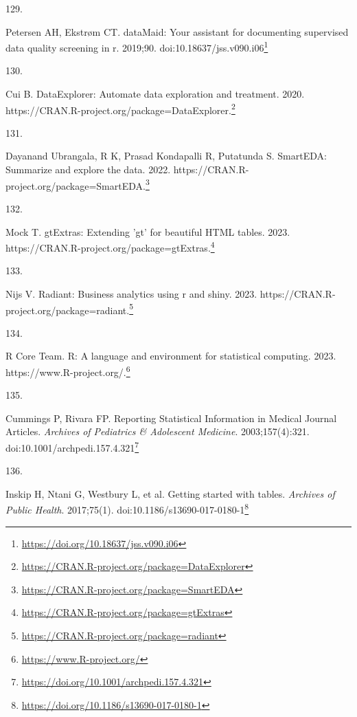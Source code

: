 \documentclass[
  a4paper,
]{book}
\newlength{\cslhangindent}
\newlength{\csllabelwidth}
\newlength{\cslentryspacingunit} %
\newenvironment{CSLReferences}[2] %
 {%
  \setlength{\parindent}{0pt}
  \ifodd #1
  \let\oldpar\par
  \def\par{\hangindent=\cslhangindent\oldpar}
  \fi
  \setlength{\parskip}{#2\cslentryspacingunit}
 }%
 {}
\newcommand{\CSLLeftMargin}[1]{\parbox[t]{\csllabelwidth}{#1}}
\newcommand{\CSLRightInline}[1]{\parbox[t]{\linewidth - \csllabelwidth}{#1}\break}
\renewcommand{\href}[2]{#2\footnote{\url{#1}}}
\begin{document}
\begin{CSLReferences}{0}{0}
\leavevmode{}%
\CSLLeftMargin{129. }%
\CSLRightInline{Petersen AH, Ekstrøm CT. {\textbraceleft}dataMaid{\textbraceright}: Your assistant for documenting supervised data quality screening in {\textbraceleft}r{\textbraceright}. 2019;90. doi:\href{https://doi.org/10.18637/jss.v090.i06}{10.18637/jss.v090.i06}}

\leavevmode{}%
\CSLLeftMargin{130. }%
\CSLRightInline{Cui B. DataExplorer: Automate data exploration and treatment. 2020. \href{https://CRAN.R-project.org/package=DataExplorer}{https://CRAN.R-project.org/package=DataExplorer.}}

\leavevmode{}%
\CSLLeftMargin{131. }%
\CSLRightInline{Dayanand Ubrangala, R K, Prasad Kondapalli R, Putatunda S. SmartEDA: Summarize and explore the data. 2022. \href{https://CRAN.R-project.org/package=SmartEDA}{https://CRAN.R-project.org/package=SmartEDA.}}

\leavevmode{}%
\CSLLeftMargin{132. }%
\CSLRightInline{Mock T. gtExtras: Extending 'gt' for beautiful HTML tables. 2023. \href{https://CRAN.R-project.org/package=gtExtras}{https://CRAN.R-project.org/package=gtExtras.}}

\leavevmode{}%
\CSLLeftMargin{133. }%
\CSLRightInline{Nijs V. Radiant: Business analytics using r and shiny. 2023. \href{https://CRAN.R-project.org/package=radiant}{https://CRAN.R-project.org/package=radiant.}}

\leavevmode{}%
\CSLLeftMargin{134. }%
\CSLRightInline{R Core Team. R: A language and environment for statistical computing. 2023. \href{https://www.R-project.org/}{https://www.R-project.org/.}}

\leavevmode{}%
\CSLLeftMargin{135. }%
\CSLRightInline{Cummings P, Rivara FP. Reporting Statistical Information in Medical Journal Articles. \emph{Archives of Pediatrics \& Adolescent Medicine}. 2003;157(4):321. doi:\href{https://doi.org/10.1001/archpedi.157.4.321}{10.1001/archpedi.157.4.321}}

\leavevmode{}%
\CSLLeftMargin{136. }%
\CSLRightInline{Inskip H, Ntani G, Westbury L, et al. Getting started with tables. \emph{Archives of Public Health}. 2017;75(1). doi:\href{https://doi.org/10.1186/s13690-017-0180-1}{10.1186/s13690-017-0180-1}}


\end{CSLReferences}
\end{document}
